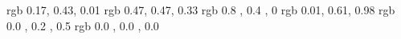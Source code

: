 
 \usepackage{color}
 \usepackage{listings}    
 \usepackage{courier}
 
 \definecolor{arduinoGreen}    {rgb} {0.17, 0.43, 0.01}
 \definecolor{arduinoGrey}     {rgb} {0.47, 0.47, 0.33}
 \definecolor{arduinoOrange}   {rgb} {0.8 , 0.4 , 0   }
 \definecolor{arduinoBlue}     {rgb} {0.01, 0.61, 0.98}
 \definecolor{arduinoDarkBlue} {rgb} {0.0 , 0.2 , 0.5 }
 \definecolor{arduinoBlack}    {rgb} {0.0 , 0.0 , 0.0}
 
